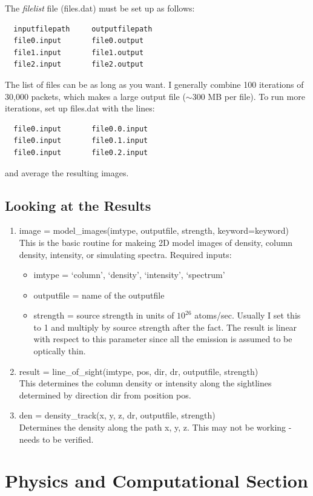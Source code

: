 \documentclass[11pt]{article}
\begin{document}
The \textit{filelist} file (files.dat) must be set up as follows:
  \begin{verbatim}
  inputfilepath		outputfilepath
  file0.input		file0.output
  file1.input		file1.output
  file2.input		file2.output
  \end{verbatim}
The list of files can be as long as you want. I generally combine 100
iterations of 30,000 packets, which makes a large output file ($\sim$300 MB per
file). To run more iterations, set up files.dat with the lines:
  \begin{verbatim}
  file0.input		file0.0.input
  file0.input		file0.1.input
  file0.input		file0.2.input
  \end{verbatim}
and average the resulting images.

\subsection{Looking at the Results}

\begin{enumerate}
\item image = model\_images(imtype, outputfile, strength, keyword=keyword) \\
This is the basic routine for makeing 2D model images of density, column
density, intensity, or simulating spectra. Required inputs:
  \begin{itemize}
  \item imtype = `column', `density', `intensity', `spectrum'
  \item outputfile = name of the outputfile
  \item strength = source strength in units of $10^{26}$ atoms/sec. Usually I
  set this to 1 and multiply by source strength after the fact. The result is
  linear with respect to this parameter since all the emission is assumed to be
  optically thin.
  \end{itemize}
\item result = line\_of\_sight(imtype, pos, dir, dr, outputfile, strength) \\
This determines the column density or intensity along the sightlines determined
by direction dir from position pos. 
\item den = density\_track(x, y, z, dr, outputfile, strength) \\
Determines the density along the path x, y, z. This may not be working - needs
to be verified.
\end{enumerate}

\section{Physics and Computational Section}
\end{document}
